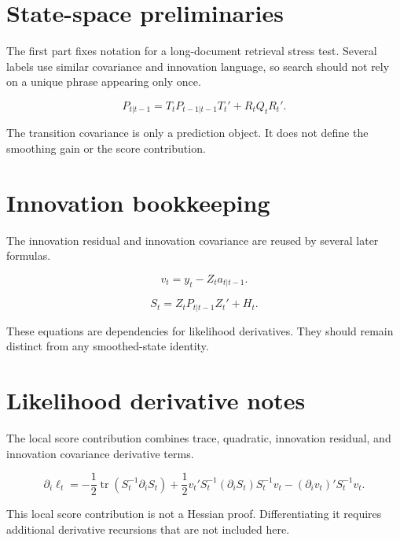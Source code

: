 \section{State-space preliminaries}
The first part fixes notation for a long-document retrieval stress test. Several labels use similar covariance and innovation language, so search should not rely on a unique phrase appearing only once.

\begin{equation}\label{eq:longdoc-transition-covariance}
P_{t|t-1} = T_t P_{t-1|t-1}T_t' + R_t Q_t R_t'.
\end{equation}

The transition covariance is only a prediction object. It does not define the smoothing gain or the score contribution.

\section{Innovation bookkeeping}
The innovation residual and innovation covariance are reused by several later formulas.

\begin{equation}\label{eq:longdoc-innovation-residual}
v_t = y_t - Z_t a_{t|t-1}.
\end{equation}

\begin{equation}\label{eq:longdoc-innovation-covariance}
S_t = Z_t P_{t|t-1}Z_t' + H_t.
\end{equation}

These equations are dependencies for likelihood derivatives. They should remain distinct from any smoothed-state identity.

\section{Likelihood derivative notes}
The local score contribution combines trace, quadratic, innovation residual, and innovation covariance derivative terms.

\begin{equation}\label{eq:longdoc-score-contribution}
\partial_i \ell_t
= -\frac{1}{2}\operatorname{tr}(S_t^{-1}\partial_i S_t)
+ \frac{1}{2}v_t' S_t^{-1}(\partial_i S_t)S_t^{-1}v_t
- (\partial_i v_t)'S_t^{-1}v_t.
\end{equation}

This local score contribution is not a Hessian proof. Differentiating it requires additional derivative recursions that are not included here.

